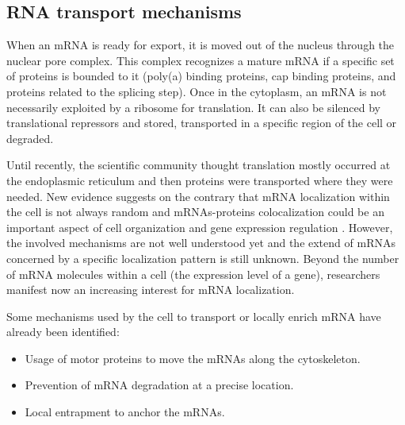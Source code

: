 \subsection{RNA transport mechanisms}
\label{subsec:intro_rna_transport}

When an \ac{mRNA} is ready for export, it is moved out of the nucleus through the nuclear pore complex.
This complex recognizes a mature \ac{mRNA} if a specific set of proteins is bounded to it (poly(a) binding proteins, cap binding proteins, and proteins related to the splicing step).
Once in the cytoplasm, an \ac{mRNA} is not necessarily exploited by a ribosome for translation.
It can also be silenced by translational repressors and stored, transported in a specific region of the cell or degraded.

Until recently, the scientific community thought translation mostly occurred at the endoplasmic reticulum and then proteins were transported where they were needed.
New evidence suggests on the contrary that \ac{mRNA} localization within the cell is not always random and \ac{mRNA}s-proteins colocalization could be an important aspect of cell organization and gene expression regulation \cite{Lecuyer2007}.
However, the involved mechanisms are not well understood yet and the extend of \ac{mRNA}s concerned by a specific localization pattern is still unknown.
Beyond the number of \ac{mRNA} molecules within a cell (the expression level of a gene), researchers manifest now an increasing interest for \ac{mRNA} localization.

\noindent
Some mechanisms used by the cell to transport or locally enrich \ac{mRNA} have already been identified:
\begin{itemize}
	\item Usage of motor proteins to move the \ac{mRNA}s along the cytoskeleton.
	\item Prevention of \ac{mRNA} degradation at a precise location.
	\item Local entrapment to anchor the \ac{mRNA}s.
\end{itemize}


